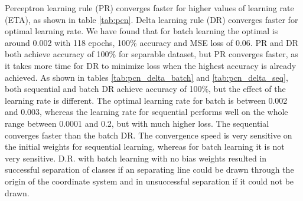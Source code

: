 \documentclass[a4paper]{article}
\begin{document}
Perceptron learning rule (PR) converges faster for higher values of learning rate (ETA), as shown in table \ref{tab:pcn}. Delta learning rule (DR) converges faster for optimal learning rate. We have found that for batch learning the optimal is around 0.002 with 118 epochs, 100\% accuracy and MSE loss of 0.06. %
PR and DR both achieve accuracy of 100\% for separable dataset, but PR converges faster, as it takes more time for DR to minimize loss when the highest accuracy is already achieved.
As shown in tables \ref{tab:pcn_delta_batch} and \ref{tab:pcn_delta_seq}, both sequential and batch DR achieve accuracy of 100\%, but the effect of the learning rate is different. The optimal learning rate for batch is between 0.002 and 0.003, whereas the learning rate for sequential performs well on the whole range between 0.0001 and 0.2, but with much higher loss. %
The sequential converges faster than the batch DR. %
The convergence speed is very sensitive on the initial weights for sequential learning, whereas for batch learning it is not very sensitive. %
D.R. with batch learning with no bias weights resulted in successful separation of classes if an separating line could be drawn through the origin of the coordinate system and in unsuccessful separation if it could not be drawn.
\end{document}
